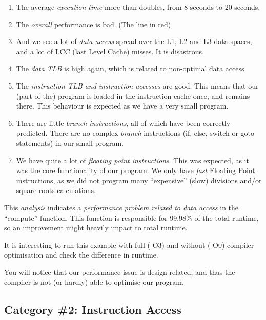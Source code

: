 \begin{enumerate}
  \item The average \emph{execution time} more than doubles, from 8 seconds to 20 seconds.
  \item The \emph{overall} performance is bad. (The line in red)
  \item And we see a lot of \emph{data access} spread over the L1, L2 and L3 data spaces, and a lot of LCC (last Level Cache) misses. It is disastrous.
  \item The \emph{data TLB} is high again, which is related to non-optimal data access.
  \item The \emph{instruction TLB and instruction accesses} are good. This means that our (part of the) program is loaded in the instruction cache once, and remains there. This behaviour is expected as we have a very small program.
  \item There are little \emph{branch instructions}, all of which have been correctly predicted. There are no complex \emph{branch} instructions (if, else, switch or goto statements) in our small program.
  \item We have quite a lot of \emph{floating point instructions}. This was expected, as it was the core functionality of our program. We only have \emph{fast} Floating Point instructions, as we did not program many ``expensive'' (slow) divisions and/or square-roots calculations.
\end{enumerate}

This \emph{analysis} indicates a \emph{performance problem related to data access} in the ``compute'' function. This function is responsible for 99.98\% of the total runtime, so an improvement might heavily impact to total runtime.

\begin{tip}
It is interesting to run this example with full (-O3) and without (-O0) compiler optimisation and check the difference in runtime.
\end{tip}

\begin{prompt}
\end{prompt}

You will notice that our performance issue is design-related, and thus the compiler is not (or hardly) able to optimise our program.

\subsection{Category \#2: Instruction Access}
\label{subsec:CAT2_Instruction_Access}

